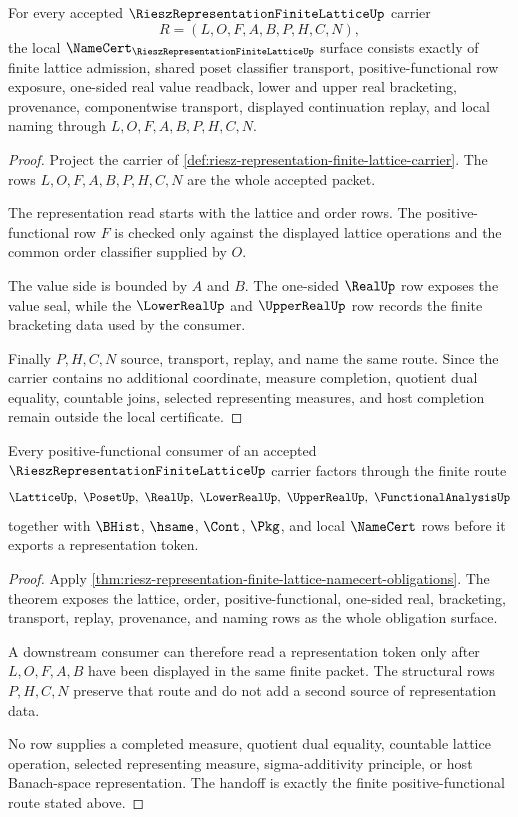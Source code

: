 \begin{theorem}
\label{thm:riesz-representation-finite-lattice-namecert-obligations}
For every accepted $\RieszRepresentationFiniteLatticeUp$ carrier
$$
R=(L,O,F,A,B,P,H,C,N),
$$
the local $\NameCert_{\RieszRepresentationFiniteLatticeUp}$ surface consists exactly of finite lattice admission, shared poset classifier transport, positive-functional row exposure, one-sided real value readback, lower and upper real bracketing, provenance, componentwise transport, displayed continuation replay, and local naming through $L,O,F,A,B,P,H,C,N$.
\end{theorem}
\begin{proof}
Project the carrier of \autoref{def:riesz-representation-finite-lattice-carrier}. The rows $L,O,F,A,B,P,H,C,N$ are the whole accepted packet.

The representation read starts with the lattice and order rows. The positive-functional row $F$ is checked only against the displayed lattice operations and the common order classifier supplied by $O$.

The value side is bounded by $A$ and $B$. The one-sided $\RealUp$ row exposes the value seal, while the $\LowerRealUp$ and $\UpperRealUp$ row records the finite bracketing data used by the consumer.

Finally $P,H,C,N$ source, transport, replay, and name the same route. Since the carrier contains no additional coordinate, measure completion, quotient dual equality, countable joins, selected representing measures, and host completion remain outside the local certificate.
\end{proof}

\begin{theorem}
\label{thm:riesz-representation-finite-lattice-positive-functional-handoff}
Every positive-functional consumer of an accepted $\RieszRepresentationFiniteLatticeUp$ carrier factors through the finite route
$$
\LatticeUp,\ \PosetUp,\ \RealUp,\ \LowerRealUp,\ \UpperRealUp,\ \FunctionalAnalysisUp
$$
together with $\BHist$, $\hsame$, $\Cont$, $\Pkg$, and local $\NameCert$ rows before it exports a representation token.
\end{theorem}
\begin{proof}
Apply \autoref{thm:riesz-representation-finite-lattice-namecert-obligations}. The theorem exposes the lattice, order, positive-functional, one-sided real, bracketing, transport, replay, provenance, and naming rows as the whole obligation surface.

A downstream consumer can therefore read a representation token only after $L,O,F,A,B$ have been displayed in the same finite packet. The structural rows $P,H,C,N$ preserve that route and do not add a second source of representation data.

No row supplies a completed measure, quotient dual equality, countable lattice operation, selected representing measure, sigma-additivity principle, or host Banach-space representation. The handoff is exactly the finite positive-functional route stated above.
\end{proof}

